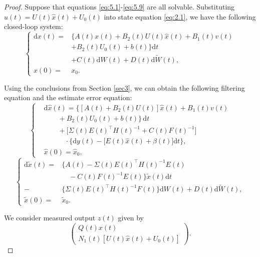 \documentclass[10pt,a4paper]{amsart}
\begin{document}
\begin{proof}
	Suppose that equations \eqref{eq:5.1}-\eqref{eq:5.9} are all solvable. Substituting $u(t) = U(t)\widehat{x}(t) + U_0(t)$ into state equation \eqref{eq:2.1}, we have the following closed-loop system:
	\begin{equation*}
		\left\{
		\begin{aligned}
			\mathrm{d}x(t) =& \Big\{ A(t)x(t) + B_2(t)U(t)\widehat{x}(t) + B_1(t)v(t) \\
			& + B_2(t)U_0(t) + b(t) \Big\} \mathrm{d}t \\
			& + C(t)\mathrm{d}W(t) + D(t)\mathrm{d}\widetilde{W}(t),\\
			x(0)=&x_0.
		\end{aligned}
		\right.
	\end{equation*}
	
	Using the conclusions from Section \ref{sec3}, we can obtain the following filtering equation and the estimate error equation:
	\begin{equation}\label{eq:5.13}
		\left\{
		\begin{aligned}
			&\mathrm{d}\widehat{x}(t) = \Big\{[A(t) + B_2(t)U(t)]\widehat{x}(t) + B_1(t)v(t) \\
			&\qquad + B_2(t)U_0(t) + b(t)\Big\}\,\mathrm{d}t \\
			&\qquad + \big[\Sigma(t)E(t)^{\top}H(t)^{-1} + C(t)F(t)^{-1}\big] \\
			&\qquad\quad \cdot \big\{\mathrm{d}y(t) - \big[E(t)\widehat{x}(t) + \beta(t)\big]\mathrm{d}t\big\},\\
			&\widehat{x}(0) = \widehat{x}_0,
		\end{aligned}
		\right.
	\end{equation}
	\begin{equation}\label{eq:5.14}
		\left\{
		\begin{aligned}
			\mathrm{d}\widetilde{x}(t) =& \Big\{A(t) - \Sigma(t)E(t)^{\top}H(t)^{-1}E(t) \\
			&\quad - C(t)F(t)^{-1}E(t)\Big\}\widetilde{x}(t)\mathrm{d}t\\
			-& \Big\{\Sigma(t)E(t)^{\top}H(t)^{-1}F(t)\Big\}\mathrm{d}W(t) + D(t)\mathrm{d}\widetilde{W}(t),\\
			\widetilde{x}(0) = &\widetilde{x}_0.
		\end{aligned}
		\right.
	\end{equation}
	
	We consider measured output $z(t)$ given by
	\begin{equation*}
		\begin{pmatrix}
			Q(t)x(t)\\
			N_1(t)[U(t)\widehat{x}(t) + U_0(t)]
		\end{pmatrix}.
	\end{equation*} 
	

\end{proof}
\end{document}
